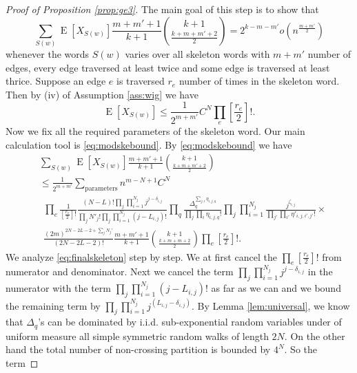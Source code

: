 \documentclass[12pt]{article}
\numberwithin{equation}{section}
\numberwithin{equation}{section}
\theoremstyle{definition}
\DeclareMathOperator{\E}{E} \DeclareMathOperator{\var}{Var}
\renewcommand{\1}{\bf 1}
\begin{document}
\begin{proof}[Proof of Proposition \ref{prop:ge3}]
The main goal of this step is to show that 
\begin{equation}\label{eq:skeletonrep}
\sum_{S(w)} \E[X_{S(w)}] \frac{m+m'+1}{k+1}\binom{k+1}{\frac{k+m+m'+2}{2}}= 2^{k-m-m'}o\left(n^{\frac{m+m'}{2}}\right)
\end{equation}
whenever the words $S(w)$ varies over all skeleton words with $m+m'$ number of edges, every edge traversed at least twice and some edge is traversed at least thrice. Suppose an edge $e$ is traversed $r_{e}$ number of times in the skeleton word. Then by (iv) of Assumption \ref{ass:wig} we have 
\begin{equation}
\E[X_{S(w)}]\le \frac{1}{2^{m+m'}}C^{N}\prod_{e} \left[ \frac{r_{e}}{2} \right]!.
\end{equation}
Now we fix all the required parameters of the skeleton word. Our main calculation tool is \eqref{eq:modskebound}. By \eqref{eq:modskebound} we have 
\begin{equation}\label{eq:finalskeleton}
\begin{split}
&\sum_{S(w)} \E[X_{S(w)}] \frac{m+m'+1}{k+1}\binom{k+1}{\frac{k+m+m'+2}{2}}\\
&\le \frac{1}{2^{m+m'}}\sum_{\text{parameters}}n^{m- N +1}C^{N}\\
&~~\prod_{e} \frac{1}{\left[\frac{r_{e}}{2}\right]!} \frac{(N-L)!\prod_{j}\prod_{i=1}^{N_{j}}j^{j-\delta_{i,j}}}{\prod_{j}N'_{j}! \prod_{j}\prod_{i=1}^{N_{j}}(j-L_{i,j})!}\prod_{q} \frac{\Delta_{q}^{\sum_{j,i}\eta_{i,j,q} }}{\prod_{j}\prod_{i}\eta_{i,j,q}!}\prod_{j}\prod_{i=1}^{N_{j}} \frac{j^{\zeta_{i,j}}}{\prod_{j'}\prod_{i'} \eta'_{i,j,i',j'}!} \times \\
&~~ \frac{(2m)^{2N-2L-2+ \sum_{j}N_{j}'}}{(2N-2L-2)!}\frac{m+m'+1}{k+1}\binom{k+1}{\frac{k+m+m +2}{2}} \prod_{e} \left[ \frac{r_{e}}{2} \right]!.
\end{split}
\end{equation}  
We analyze \eqref{eq:finalskeleton} step by step. 
We at first cancel the $\prod_{e}\left[ \frac{r_{e}}{2} \right]!$ from numerator and denominator. Next we cancel the term $\prod_{j}\prod_{i=1}^{N_{j}}j^{j-\delta_{i,j}}$ in the numerator with the term $\prod_{j}\prod_{i=1}^{N_{j}}(j-L_{i,j})!$ as far as we can and we bound the remaining term by $\prod_{j}\prod_{i=1}^{N_{j}}j^{(L_{i,j}-\delta_{i,j})}$. By Lemma \ref{lem:universal}, we know that $\Delta_{q}$'s can be dominated by i.i.d. sub-exponential random variables under of uniform measure all simple symmetric random walks of length $2N$. On the other hand the total number of non-crossing partition is bounded by $4^{N}$.  So the term

\end{proof}
\end{document}
